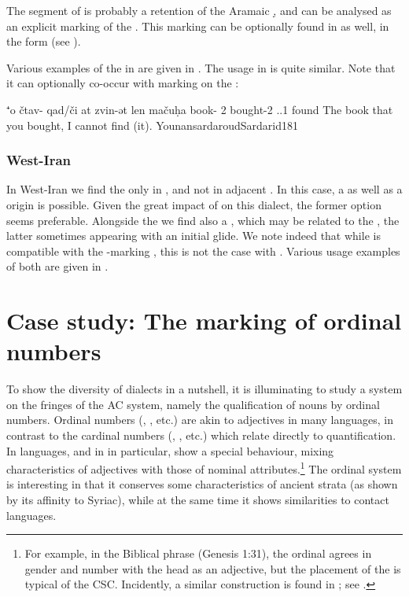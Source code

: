 The  segment of \Sar {} is probably a retention of the Aramaic \d, and can be analysed as an explicit \cst* marking of the \rel*. This marking can be optionally found in \JUrm as well, in the form  (see ).

Various examples of the \rel* in \JUrm are given in . The usage in \Sar is quite similar. Note that it can optionally co-occur with \cst* marking on the \prim:

{⁺o čtav- qad/či at zvin-ət len mačuḥa}
{ book-\opt\cst{} \rel{} 2\masc{} bought-2\masc{} \neg.\cop.1\sg{} found}
{The book that you bought, I cannot find (it).}
{YounansardaroudSardarid}{181}

\subsubsection{West-Iran}

In West-Iran we find the \rel* {} only in \JSan, and not in adjacent \CSan. In this case, a \Per as well as a \Sor origin is possible. Given the great impact of \Per on this dialect, the former option seems preferable. Alongside the  \rel* we find also a  \rel*, which may be related to the \Per \ez*, the latter sometimes appearing with an initial glide. We note indeed that while  is compatible with the \prim-marking \ez*, this is not the case with . Various usage examples of both are given in .


\section{Case study: The marking of ordinal numbers}\label{ss:case-study}

To show the diversity of  dialects in a nutshell, it is illuminating to study a system on the fringes of the AC system, namely the qualification of nouns by ordinal numbers. Ordinal numbers (, , etc.) are akin to adjectives in many languages, in contrast to the cardinal numbers (, , etc.) which relate directly to quantification. In  languages, and in  in particular,  show a special behaviour, mixing characteristics of adjectives with those of nominal attributes.\footnote{For example, in the Biblical  phrase  (Genesis 1:31), the ordinal  agrees in gender and number with the head  as an adjective, but the placement of the   is typical of the  CSC. Incidently, a similar construction is found in \Iraq; see .} 
The  ordinal system is interesting in that it conserves some characteristics of ancient strata (as shown by its affinity to Syriac), while at the same time it shows similarities to contact languages.


